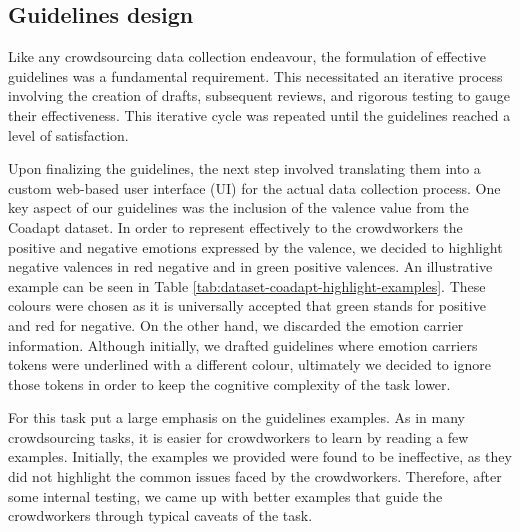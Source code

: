 \subsection{Guidelines design}
Like any crowdsourcing data collection endeavour, the formulation of effective guidelines was a fundamental requirement. This necessitated an iterative process involving the creation of drafts, subsequent reviews, and rigorous testing to gauge their effectiveness. This iterative cycle was repeated until the guidelines reached a level of satisfaction.

Upon finalizing the guidelines, the next step involved translating them into a custom web-based user interface (UI) for the actual data collection process. One key aspect of our guidelines was the inclusion of the valence value from the Coadapt dataset. In order to represent effectively to the crowdworkers the positive and negative emotions expressed by the valence, we decided to highlight negative valences in red negative and in green positive valences. An illustrative example can be seen in Table \ref{tab:dataset-coadapt-highlight-examples}. These colours were chosen as it is universally accepted that green stands for positive and red for negative. On the other hand, we discarded the emotion carrier information. Although initially, we drafted guidelines where emotion carriers tokens were underlined with a different colour, ultimately we decided to ignore those tokens in order to keep the cognitive complexity of the task lower.

For this task put a large emphasis on the guidelines examples. As in many crowdsourcing tasks, it is easier for crowdworkers to learn by reading a few examples. Initially, the examples we provided were found to be ineffective, as they did not highlight the common issues faced by the crowdworkers. Therefore, after some internal testing, we came up with better examples that guide the crowdworkers through typical caveats of the task.

